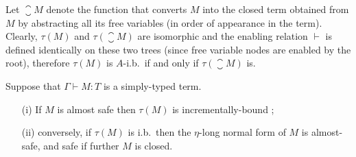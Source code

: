 \smallskip

Let $\closure{M}$ denote the function that converts $M$ into the
closed term obtained from $M$ by abstracting all its free variables
(in order of appearance in the term).
Clearly, $\tau(M)$ and $\tau(\closure{M})$ are isomorphic and the enabling relation $\vdash$ is defined identically
on these two trees (since free variable nodes are enabled by the root), therefore $\tau(M)$ is $A$-i.b.\ if and only if $\tau(\closure{M})$ is.
\smallskip

\begin{lemma}
\label{lem:incrbound_iff_etanf_safe} Suppose that  $\Gamma \vdash M
:T$ is a simply-typed term.
\begin{itemize}
\item[(i)] If $M$ is almost safe then $\tau(M)$ is incrementally-bound ;
\item[(ii)] conversely, if $\tau(M)$ is i.b.\ then the $\eta$-long normal form of $M$ is almost-safe, and safe if further $M$ is closed.
\end{itemize}
\end{lemma}
